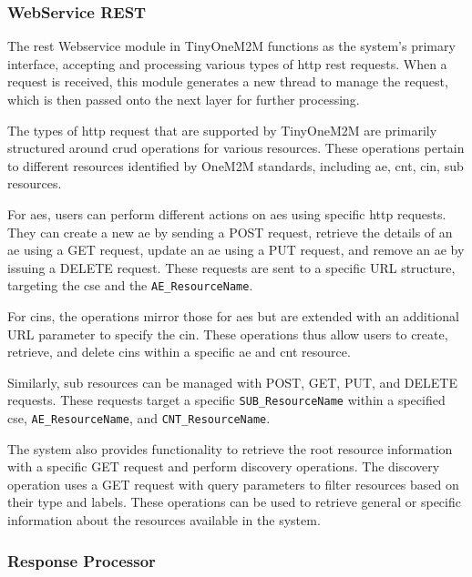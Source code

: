 \documentclass[a4paper,fleqn]{cas-dc}
\begin{document}
\subsubsection{WebService REST}\label{sec:archwebservice}

The \gls{rest} Webservice module in TinyOneM2M functions as the system's primary interface, accepting and processing various types of \gls{http} \gls{rest} requests. When a request is received, this module generates a new thread to manage the request, which is then passed onto the next layer for further processing.

The types of \gls{http} request that are supported by TinyOneM2M are primarily structured around \gls{crud} operations for various resources. These operations pertain to different resources identified by OneM2M standards, including \gls{ae}, \gls{cnt}, \gls{cin}, \gls{sub} resources.

For \gls{aes}, users can perform different actions on \glspl{ae} using specific \gls{http} requests. They can create a new \gls{ae} by sending a POST request, retrieve the details of an \gls{ae} using a GET request, update an \gls{ae} using a PUT request, and remove an \gls{ae} by issuing a DELETE request. These requests are sent to a specific URL structure, targeting the \gls{cse} and the \texttt{AE\_ResourceName}.

For \gls{cins}, the operations mirror those for \gls{aes} but are extended with an additional URL parameter to specify the \gls{cin}. These operations thus allow users to create, retrieve, and delete \gls{cins} within a specific \gls{ae} and \gls{cnt} resource.

Similarly, \gls{sub} resources can be managed with POST, GET, PUT, and DELETE requests. These requests target a specific \texttt{SUB\_ResourceName} within a specified \gls{cse}, \texttt{AE\_ResourceName}, and \texttt{CNT\_ResourceName}.

The system also provides functionality to retrieve the root resource information with a specific GET request and perform discovery operations. The discovery operation uses a GET request with query parameters to filter resources based on their type and labels. These operations can be used to retrieve general or specific information about the resources available in the system.

\subsubsection{Response Processor} \label{sec:archresponseprocessor}
\end{document}
